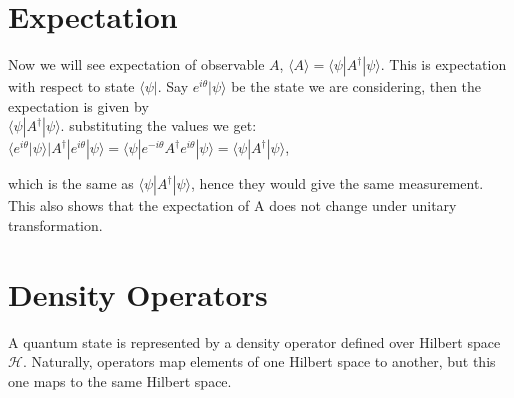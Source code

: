 \documentclass{article}
\begin{document}
\section{Expectation}
Now we will see expectation of observable $A$, $\langle A \rangle = \langle \psi | A^{\dagger} | \psi \rangle$. This is expectation with respect to state $\langle \psi |$.
Say $e^{i\theta}|\psi\rangle$ be the state we are considering, then the expectation is given by \\
$\langle \psi |A^{\dagger} | \psi \rangle$.
 substituting the values we get: \\

$\langle e^{i\theta}|\psi\rangle |A^{\dagger} | e^{i\theta}|\psi\rangle = \langle\psi|e^{-i\theta}A^{\dagger}e^{i\theta}|\psi\rangle = \langle\psi|A^{\dagger}|\psi\rangle$,

which is the same as $\langle \psi |A^{\dagger} | \psi \rangle$, hence they would give the same measurement.
\\
This also shows that the expectation of A does not change under unitary transformation.

\section{Density Operators}
A quantum state is represented by a density operator defined over Hilbert space $\mathcal{H}$. Naturally, operators map elements of one Hilbert space to another, but this one maps to the same Hilbert space.
\end{document}
